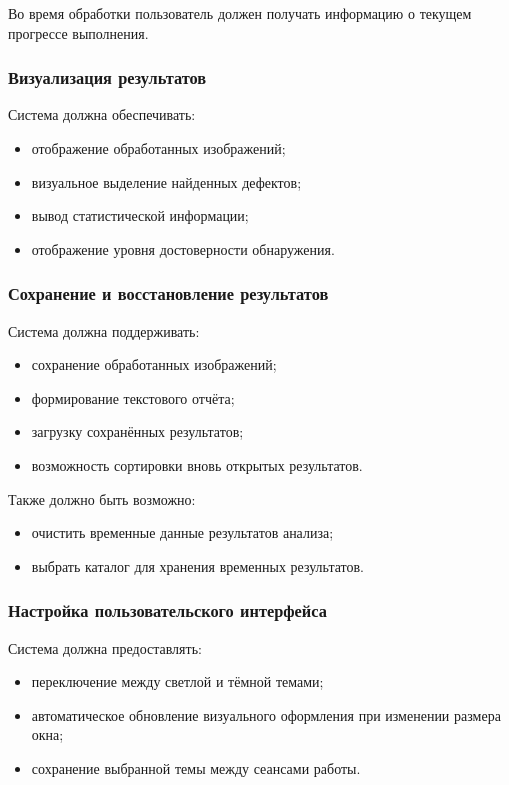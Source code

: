 Во время обработки пользователь должен получать информацию о текущем прогрессе выполнения.

\subsubsection{Визуализация результатов}

Система должна обеспечивать:

\begin{itemize}
	\item отображение обработанных изображений;
	\item визуальное выделение найденных дефектов;
	\item вывод статистической информации;
	\item отображение уровня достоверности обнаружения.
\end{itemize}

\subsubsection{Сохранение и восстановление результатов}

Система должна поддерживать:

\begin{itemize}
	\item сохранение обработанных изображений;
	\item формирование текстового отчёта;
	\item загрузку сохранённых результатов;
	\item возможность сортировки вновь открытых результатов.
\end{itemize}

Также должно быть возможно:
\begin{itemize}
	\item очистить временные данные результатов анализа;
	\item выбрать каталог для хранения временных результатов.
\end{itemize}

\subsubsection{Настройка пользовательского интерфейса}

Система должна предоставлять:

\begin{itemize}
	\item переключение между светлой и тёмной темами;
	\item автоматическое обновление визуального оформления при изменении размера окна;
	\item сохранение выбранной темы между сеансами работы.
\end{itemize}

